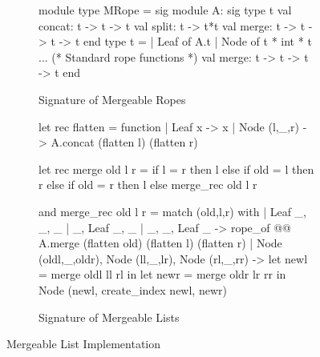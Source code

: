 \begin{figure}

\begin{subfigure}{0.35\textwidth}
\begin{ocaml}
module type MRope = sig
  module A: sig
    type t
    val concat: t -> t -> t
    val split: t -> t*t
    val merge: t -> t -> t -> t
  end
  type t =
  | Leaf of A.t
  | Node of t * int * t
  ... 
  (* Standard rope functions *)
  val merge: t -> t -> t -> t 
end
\end{ocaml}
\caption{Signature of Mergeable Ropes}
\label{fig:mrope-sig}
\end{subfigure}
\begin{subfigure}{0.6\textwidth}
\begin{ocaml}
let rec flatten = function
  | Leaf x -> x
  | Node (l,_,r) -> A.concat (flatten l) (flatten r)

let rec merge old l r =
  if l = r then l else if old = l then r
  else if old = r then l else merge_rec old l r

and merge_rec old l r = match (old,l,r) with
  | Leaf _, _, _ | _, Leaf _, _ 
  | _, _, Leaf _ -> 
      rope_of @@ A.merge (flatten old) 
                    (flatten l) (flatten r)
  | Node (oldl,_,oldr), Node (ll,_,lr), 
    Node (rl,_,rr) ->
      let newl = merge oldl ll rl in
      let newr = merge oldr lr rr in
        Node (newl, create_index newl, newr)
\end{ocaml}
\caption{Signature of Mergeable Lists}
\label{fig:mrope-merge}
\end{subfigure}

\caption{Mergeable List Implementation}
\label{fig:rope}
\end{figure}
